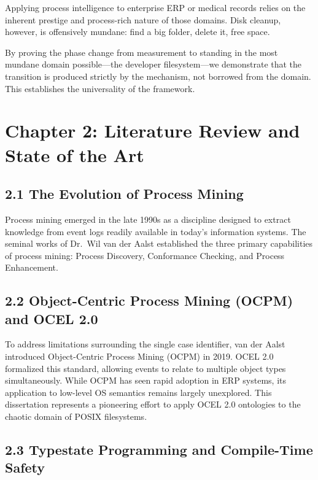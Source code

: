 \documentclass[
  12pt,
]{report}
\begin{document}
Applying process intelligence to enterprise ERP or medical records
relies on the inherent prestige and process-rich nature of those
domains. Disk cleanup, however, is offensively mundane: find a big
folder, delete it, free space.

By proving the phase change from measurement to standing in the most
mundane domain possible---the developer filesystem---we demonstrate that
the transition is produced strictly by the mechanism, not borrowed from
the domain. This establishes the universality of the framework.

\chapter{Chapter 2: Literature Review and State of the
Art}\label{chapter-2-literature-review-and-state-of-the-art}

\section{2.1 The Evolution of Process
Mining}\label{the-evolution-of-process-mining}

Process mining emerged in the late 1990s as a discipline designed to
extract knowledge from event logs readily available in today's
information systems. The seminal works of Dr.~Wil van der Aalst
established the three primary capabilities of process mining: Process
Discovery, Conformance Checking, and Process Enhancement.

\section{2.2 Object-Centric Process Mining (OCPM) and OCEL
2.0}\label{object-centric-process-mining-ocpm-and-ocel-2.0}

To address limitations surrounding the single case identifier, van der
Aalst introduced Object-Centric Process Mining (OCPM) in 2019. OCEL 2.0
formalized this standard, allowing events to relate to multiple object
types simultaneously. While OCPM has seen rapid adoption in ERP systems,
its application to low-level OS semantics remains largely unexplored.
This dissertation represents a pioneering effort to apply OCEL 2.0
ontologies to the chaotic domain of POSIX filesystems.

\section{2.3 Typestate Programming and Compile-Time
Safety}\label{typestate-programming-and-compile-time-safety}
\end{document}
